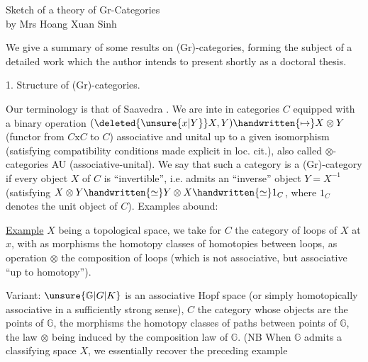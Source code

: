 
\begin{center}
Sketch of a theory of Gr-Categories\\
by Mrs Hoang Xuan Sinh
\end{center}

We give a summary of some results on (Gr)-categories, forming the subject of a detailed work which the author intends to present shortly as a doctoral thesis\handwritten{[\, ]}.

1. Structure of (Gr)-categories.

Our terminology is that of Saavedra \handwritten{[\, ]}. We are inte in categories $C$ equipped with a binary operation $(\deleted{\unsure{x|Y}}X,Y)\handwritten{\mapsto}X\otimes Y$ (functor from $C\mathbin{\mathrm{x}}C$ to $C$) associative and unital up to a given isomorphism (satisfying compatibility conditions made explicit in loc. cit.), also called $\otimes$-categories AU (associative-unital). We say that such a category is a (Gr)-category if  every object $X$ of $C$ is ``invertible'', i.e. admits an ``inverse'' object $Y=X^{-1}$ (satisfying $X\otimes Y\handwritten{\simeq}Y\otimes X\handwritten{\simeq}1_C$, where $1_C$ denotes the unit object of $C$). Examples abound:

\uline{Example}  $X$ being a topological space, we take for $C$ the category of loops of $X$ at $x$, with as morphisms the homotopy classes of homotopies between loops, as operation $\otimes$ the composition of loops (which is not associative, but associative ``up to homotopy'').

Variant: $\unsure{\mathbb{G}|G|K}$ is an associative Hopf space (or simply homotopically associative in a sufficiently strong sense), $C$ the category whose objects are the points of $\mathbb{G}$, the morphisms the homotopy classes of paths between points of $\mathbb{G}$, the law $\otimes$ being induced by the composition law of $\mathbb{G}$. (NB When $\mathbb{G}$ admits a classifying space $X$, we essentially recover the preceding example

